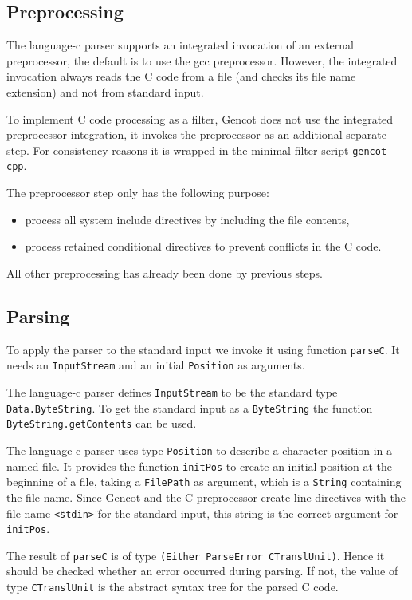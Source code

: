 \documentclass[a4paper]{report}
\newcommand{\code}[1]{\textnormal{\texttt{#1}}}
\begin{document}
\subsection{Preprocessing}

The language-c parser supports an integrated invocation of an external preprocessor, the default is to use
the gcc preprocessor. However, the integrated invocation always reads the C code from a file (and checks
its file name extension) and not from standard input.

To implement C code processing as a filter, Gencot does not use the integrated preprocessor integration,
it invokes the preprocessor as an additional separate step. For consistency reasons it is wrapped in
the minimal filter script \code{gencot-cpp}. 

The preprocessor step only has the following purpose:
\begin{itemize}
\item process all system include directives by including the file contents,
\item process retained conditional directives to prevent conflicts in the C code.
\end{itemize}
All other preprocessing has already been done by previous steps.

\subsection{Parsing}

To apply the parser to the standard input we invoke it using function \code{parseC}. It needs an \code{InputStream}
and an initial \code{Position} as arguments. 

The language-c parser defines \code{InputStream} to be the standard type \code{Data.ByteString}. To get the 
standard input as a \code{ByteString} the function \code{ByteString.getContents} can be used. 

The language-c parser uses type \code{Position} to describe a character position in a named file. It provides
the function \code{initPos} to create an initial position at the beginning of a file, taking a \code{FilePath}
as argument, which is a \code{String} containing the file name. Since Gencot and the C preprocessor create
line directives with the file name \code{\"<stdin>\"} for the standard input, this string is the correct argument
for \code{initPos}. 

The result of \code{parseC} is of type \code{(Either ParseError CTranslUnit)}. Hence it should be checked whether
an error occurred during parsing. If not, the value of type \code{CTranslUnit} is the abstract syntax tree for
the parsed C code.
\end{document}
